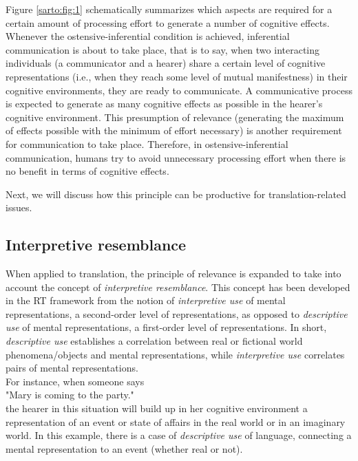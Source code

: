 \documentclass[output=paper]{langsci/langscibook}
\begin{document}
Figure \ref{sarto:fig:1} schematically summarizes which aspects are required for a certain amount of processing effort to generate a number of cognitive effects. Whenever the ostensive-inferential condition is achieved, inferential communication is about to take place, that is to say, when two interacting individuals (a communicator and a hearer) share a certain level of cognitive representations (i.e., when they reach some level of mutual manifestness) in their cognitive environments, they are ready to communicate. A communicative process is expected to generate as many cognitive effects as possible in the hearer’s cognitive environment. This presumption of relevance (generating the maximum of effects possible with the minimum of effort necessary) is another requirement for communication to take place. Therefore, in ostensive-inferential communication, humans try to avoid unnecessary processing effort when there is no benefit in terms of cognitive effects.



Next, we will discuss how this principle can be productive for translation-related issues.


\subsection{Interpretive resemblance}

When applied to translation, the principle of relevance is expanded to take into account the concept of \textit{interpretive resemblance}. This concept has been developed in the RT framework from the notion of \textit{interpretive use} of mental representations, a second-order level of representations, as opposed to \textit{descriptive use }of mental representations, a first-order level of representations. In short, \textit{descriptive use }establishes a correlation between real or fictional world phenomena/objects and mental representations, while \textit{interpretive use} correlates pairs of mental representations.\\

For instance, when someone says \\

"Mary is coming to the party."\\

the hearer in this situation will build up in her cognitive environment a representation of an event or state of affairs in the real world or in an imaginary world. In this example, there is a case of \textit{descriptive use} of language, connecting a mental representation to an event (whether real or not).\\
\end{document}
